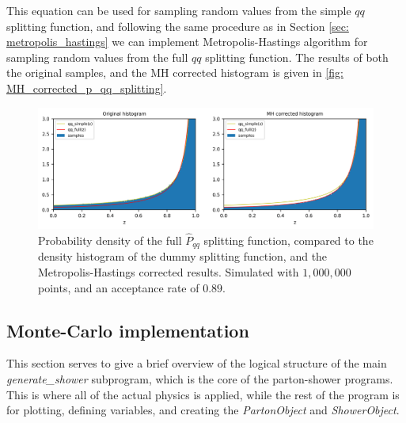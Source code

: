 \documentclass[main.tex]{subfiles}
\begin{document}
This equation can be used for sampling random values from the simple \(qq\) splitting function, and following the same procedure as in Section \ref{sec: metropolis_hastings} we can implement Metropolis-Hastings algorithm for sampling random values from the full \(qq\) splitting function. The results of both the original samples, and the MH corrected histogram is given in \autoref{fig: MH_corrected_p_qq_splitting}.
\begin{figure}[htb]
    \centering
    \includegraphics[width=15cm]{pictures/plots/Metropolis-Hastings/MH_vacuum_qq.png}
    \caption{Probability density of the full \(\hat{P}_{qq}\) splitting function, compared to the density histogram of the dummy splitting function, and the Metropolis-Hastings corrected results. Simulated with \(1,000,000\) points, and an acceptance rate of \(0.89\).}
    \label{fig: MH_corrected_p_qq_splitting}
\end{figure}

\subsection{Monte-Carlo implementation}
This section serves to give a brief overview of the logical structure of the main \textit{generate\_shower} subprogram, which is the core of the parton-shower programs. This is where all of the actual physics is applied, while the rest of the program is for plotting, defining variables, and creating the \textit{PartonObject} and \textit{ShowerObject}. 
\end{document}
